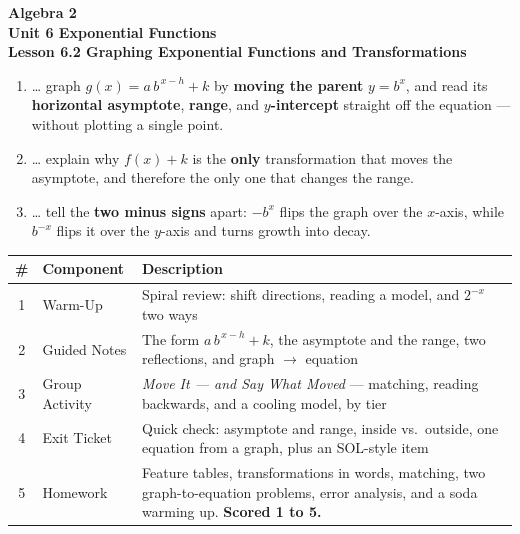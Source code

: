 \documentclass[10pt]{article}
\begin{document}
\vspace{-0.8in}

\begin{center}
  {\color{white}\textbf{\LARGE Algebra 2}}\\[4pt]
  {\color{forestmid}\large\textbf{Unit 6 \quad Exponential Functions}}\\[6pt]
  {\color{white}\textbf{\large Lesson 6.2 \quad Graphing Exponential Functions and Transformations}}
\end{center}

\vspace{0.22in}
\namedateperiod
\vspace{0.18in}

\begin{learningtargetbox}
\small
\begin{enumerate}[leftmargin=1.5em, itemsep=5pt]
  \item \ldots{} graph $g(x)=a\,b^{\,x-h}+k$ by \textbf{moving the parent} $y=b^{x}$, and read its \textbf{horizontal asymptote}, \textbf{range}, and \textbf{$y$-intercept} straight off the equation --- without plotting a single point.
  \item \ldots{} explain why $f(x)+k$ is the \textbf{only} transformation that moves the asymptote, and therefore the only one that changes the range.
  \item \ldots{} tell the \textbf{two minus signs} apart: $-b^{x}$ flips the graph over the $x$-axis, while $b^{-x}$ flips it over the $y$-axis and turns growth into decay.
\end{enumerate}
\end{learningtargetbox}

\vspace{0.14in}

\begin{tocbox}
\small
\renewcommand{\arraystretch}{1.5}
\begin{tabularx}{\linewidth}{@{} c l X @{}}
\rowcolor{forestbg}
\textbf{\#} & \textbf{Component} & \textbf{Description} \\
\midrule
1 & Warm-Up        & Spiral review: shift directions, reading a model, and $2^{-x}$ two ways \\
2 & Guided Notes   & The form $a\,b^{\,x-h}+k$, the asymptote and the range, two reflections, and graph $\to$ equation \\
3 & Group Activity & \emph{Move It --- and Say What Moved} --- matching, reading backwards, and a cooling model, by tier \\
4 & Exit Ticket    & Quick check: asymptote and range, inside vs.\ outside, one equation from a graph, plus an SOL-style item \\
5 & Homework       & Feature tables, transformations in words, matching, two graph-to-equation problems, error analysis, and a soda warming up. \textbf{Scored 1 to 5.} \\
\end{tabularx}
\end{tocbox}
\end{document}
